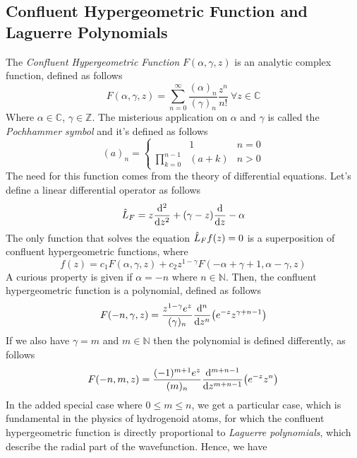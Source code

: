 \documentclass[../qm.tex]{subfiles}
\begin{document}
	\subsection{Confluent Hypergeometric Function and Laguerre Polynomials}
	The \textit{Confluent Hypergeometric Function} $F(\alpha,\gamma,z)$ is an analytic complex function, defined as follows
	\begin{equation}
		F(\alpha,\gamma,z)=\sum_{n=0}^{\infty}\frac{(\alpha)_n}{(\gamma)_n}\frac{z^n}{n!}\ \forall z\in\mathbb{C}
		\label{eq:confluenthypergeometricgen}
	\end{equation}
	Where $\alpha\in\mathbb{C}$, $\gamma\in\mathbb{Z}$. The misterious application on $\alpha$ and $\gamma$ is called the \textit{Pochhammer symbol} and it's defined as follows
	\begin{equation}
		(a)_n=\left\{\begin{aligned}
				&1&n=0\\
				\prod_{k=0}^{n-1}&(a+k)&n>0
			\end{aligned}
		\right.
		\label{eq:pochhammer}
	\end{equation}
	The need for this function comes from the theory of differential equations. Let's define a linear differential operator as follows
	\begin{equation}
		\opr{L}_F=z\derivative[2]{z}+(\gamma-z)\derivative{z}-\alpha
		\label{eq:hypergeodiff}
	\end{equation}
	The only function that solves the equation $\hat{L}_Ff(z)=0$ is a superposition of confluent hypergeometric functions, where
	\begin{equation}
		f(z)=c_1F(\alpha,\gamma,z)+c_2z^{1-\gamma}F(-\alpha+\gamma+1,\alpha-\gamma,z)
		\label{eq:solutionhypgeo}
	\end{equation}
	A curious property is given if $\alpha=-n$ where $n\in\mathbb{N}$. Then, the confluent hypergeometric function is a polynomial, defined as follows
	\begin{equation}
		F(-n,\gamma,z)=\frac{z^{1-\gamma}e^z}{(\gamma)_n}\derivative[n]{z}(e^{-z}z^{\gamma+n-1})
		\label{eq:polynomialchf}
	\end{equation}
	If we also have $\gamma=m$ and $m\in\mathbb{N}$ then the polynomial is defined differently, as follows
	\begin{equation}
		F(-n,m,z)=\frac{(-1)^{m+1}e^z}{(m)_n}\derivative[m+n-1]{z}(e^{-z}z^n)
		\label{eq:polychf2}
	\end{equation}
	In the added special case where $0\le m\le n$, we get a particular case, which is fundamental in the physics of hydrogenoid atoms, for which the confluent hypergeometric function is directly proportional to \textit{Laguerre polynomials}, which describe the radial part of the wavefunction. Hence, we have
\end{document}
